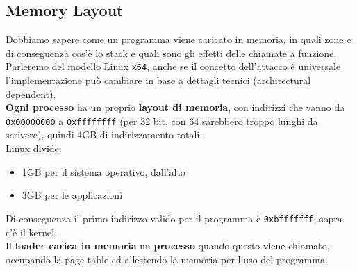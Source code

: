 \newpage

\subsection{Memory Layout}
Dobbiamo sapere come un programma viene caricato in memoria, in quali zone e di conseguenza cos'è lo stack e quali sono gli effetti delle chiamate a funzione. Parleremo del modello Linux \texttt{x64}, anche se il concetto dell'attacco è universale l'implementazione può cambiare in base a dettagli tecnici (architectural dependent).\\

\textbf{Ogni processo} ha un proprio \textbf{layout di memoria}, con indirizzi che vanno da \texttt{0x00000000} a \texttt{0xffffffff} (per 32 bit, con 64 sarebbero troppo lunghi da scrivere), quindi 4GB di indirizzamento totali.\\

Linux divide:
\begin{itemize}
	\item 1GB per il sistema operativo, dall'alto
	\item 3GB per le applicazioni
\end{itemize}
Di conseguenza il primo indirizzo valido per il programma è \texttt{0xbfffffff}, sopra c'è il kernel.\\

Il \textbf{loader carica in memoria} un \textbf{processo} quando questo viene chiamato, occupando la page table ed allestendo la memoria per l'uso del programma. \\

\newpage

